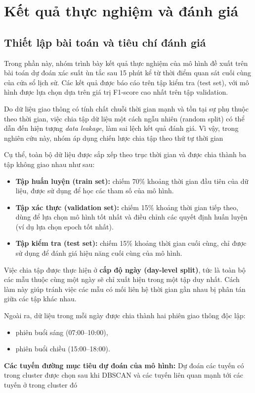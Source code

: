 \section{Kết quả thực nghiệm và đánh giá}
\label{sec:results}

\subsection{Thiết lập bài toán và tiêu chí đánh giá}
\label{subsec:eval_setup}

Trong phần này, nhóm trình bày kết quả thực nghiệm của mô hình đề xuất trên bài toán
dự đoán xác suất ùn tắc sau 15 phút kể từ thời điểm quan sát cuối cùng của cửa sổ
lịch sử. Các kết quả được báo cáo trên tập kiểm tra (test set), với mô hình được lựa chọn
dựa trên giá trị F1-score cao nhất trên tập validation.

Do dữ liệu giao thông có tính chất chuỗi thời gian mạnh và tồn tại sự phụ thuộc
theo thời gian, việc chia tập dữ liệu một cách ngẫu nhiên (random split) có thể dẫn đến
hiện tượng \textit{data leakage}, làm sai lệch kết quả đánh giá. Vì vậy, trong nghiên cứu
này, nhóm áp dụng chiến lược chia tập theo thứ tự thời gian 

Cụ thể, toàn bộ dữ liệu được sắp xếp theo trục thời gian và được chia thành ba tập không
giao nhau như sau:
\begin{itemize}
    \item \textbf{Tập huấn luyện (train set):} chiếm 70\% khoảng thời gian đầu tiên của dữ
    liệu, được sử dụng để học các tham số của mô hình.
    \item \textbf{Tập xác thực (validation set):} chiếm 15\% khoảng thời gian tiếp theo,
    dùng để lựa chọn mô hình tốt nhất và điều chỉnh các quyết định huấn luyện (ví dụ lựa
    chọn epoch tốt nhất).
    \item \textbf{Tập kiểm tra (test set):} chiếm 15\% khoảng thời gian cuối cùng, chỉ được
    sử dụng để đánh giá hiệu năng cuối cùng của mô hình.
\end{itemize}

Việc chia tập được thực hiện ở \textbf{cấp độ ngày (day-level split)}, tức là toàn bộ các
mẫu thuộc cùng một ngày sẽ chỉ xuất hiện trong một tập duy nhất. Cách làm này giúp tránh
việc các mẫu có mối liên hệ thời gian gần nhau bị phân tán giữa các tập khác nhau.

Ngoài ra, dữ liệu trong mỗi ngày được chia thành hai phiên giao thông độc lập:
\begin{itemize}
    \item phiên buổi sáng (07:00--10:00),
    \item phiên buổi chiều (15:00--18:00).
\end{itemize}
\textbf{Các tuyến đường mục tiêu dự đoán của mô hình: } Dự đoán các tuyến có trong cluster được chọn sau khi DBSCAN và các tuyến liên quan mạnh tới các tuyến ở trong cluster đó

